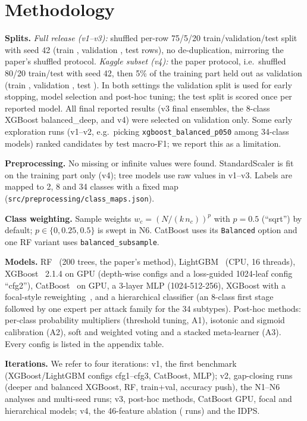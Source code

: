 \documentclass[conference]{IEEEtran}
\begin{document}
\section{Methodology}
\textbf{Splits.} \emph{Full release (v1--v3):} shuffled per-row 75/5/20 train/validation/test split with seed 42
(train \vtTrain{}, validation \vtVal{}, test \vtTest{} rows), no de-duplication, mirroring the paper's shuffled
protocol. \emph{Kaggle subset (v4):} the paper protocol, i.e.\ shuffled 80/20 train/test with seed 42, then 5\% of
the training part held out as validation (train \vfTrain{}, validation \vfVal{}, test \vfTest{}). In both
settings the validation split is used for early stopping, model selection and post-hoc tuning; the test split
is scored once per reported model. All final reported results (v3 final ensembles, the 8-class XGBoost balanced\_deep, and v4) were selected on validation only. Some early exploration runs (v1--v2, e.g.\ picking \texttt{xgboost\_balanced\_p050} among 34-class models) ranked candidates by test macro-F1; we report this as a limitation.

\textbf{Preprocessing.} No missing or infinite values were found. StandardScaler is fit on the training part
only (v4); tree models use raw values in v1--v3. Labels are mapped to 2, 8 and 34 classes with a fixed map
(\texttt{src/preprocessing/class\_maps.json}).

\textbf{Class weighting.} Sample weights $w_c=(N/(k\,n_c))^{p}$ with $p=0.5$ (``sqrt'') by default; $p\in\{0,0.25,0.5\}$
is swept in N6. CatBoost uses its \texttt{Balanced} option and one RF variant uses
\texttt{balanced\_subsample}.

\textbf{Models.} RF~\cite{breiman2001rf} (200 trees, the paper's method), LightGBM~\cite{ke2017lightgbm} (CPU,
16 threads), XGBoost~\cite{chen2016xgboost} 2.1.4 on GPU (depth-wise configs and a loss-guided 1024-leaf config
``cfg2''), CatBoost~\cite{prokhorenkova2018catboost} on GPU, a 3-layer MLP (1024-512-256), XGBoost with a
focal-style reweighting~\cite{lin2017focal}, and a hierarchical classifier (an 8-class first stage followed by
one expert per attack family for the 34 subtypes). Post-hoc methods: per-class probability multipliers
(threshold tuning, A1), isotonic and sigmoid calibration (A2), soft and weighted voting and a stacked
meta-learner (A3). Every config is listed in the appendix table.

\textbf{Iterations.} We refer to four iterations: v1, the first benchmark (XGBoost/LightGBM configs cfg1--cfg3,
CatBoost, MLP); v2, gap-closing runs (deeper and balanced XGBoost, RF, train+val, accuracy push), the N1--N6
analyses and multi-seed runs; v3, post-hoc methods, CatBoost GPU, focal and hierarchical models; v4, the
46-feature ablation (\nModelsVfour{} runs) and the IDPS.
\end{document}
